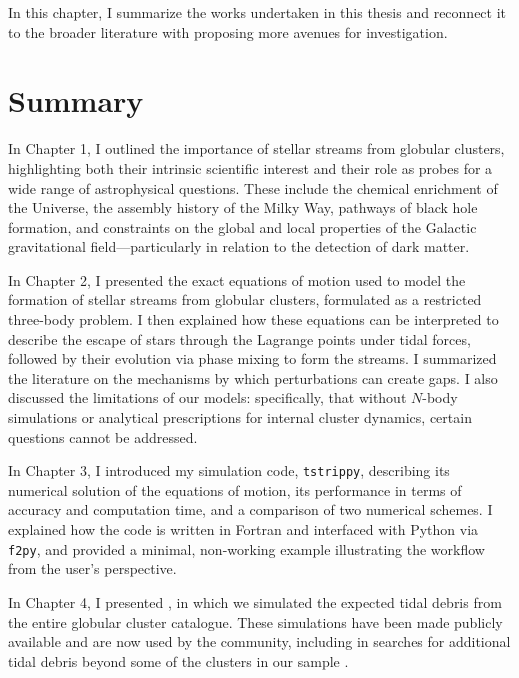 In this chapter, I summarize the works undertaken in this thesis and reconnect it to the broader literature with proposing more avenues for investigation. 

\section{Summary}
    In Chapter 1, I outlined the importance of stellar streams from globular clusters, highlighting both their intrinsic scientific interest and their role as probes for a wide range of astrophysical questions. These include the chemical enrichment of the Universe, the assembly history of the Milky Way, pathways of black hole formation, and constraints on the global and local properties of the Galactic gravitational field—particularly in relation to the detection of dark matter.

    In Chapter 2, I presented the exact equations of motion used to model the formation of stellar streams from globular clusters, formulated as a restricted three-body problem. I then explained how these equations can be interpreted to describe the escape of stars through the Lagrange points under tidal forces, followed by their evolution via phase mixing to form the streams. I summarized the literature on the mechanisms by which perturbations can create gaps. I also discussed the limitations of our models: specifically, that without $N$-body simulations or analytical prescriptions for internal cluster dynamics, certain questions cannot be addressed.

    In Chapter 3, I introduced my simulation code, \texttt{tstrippy}, describing its numerical solution of the equations of motion, its performance in terms of accuracy and computation time, and a comparison of two numerical schemes. I explained how the code is written in Fortran and interfaced with Python via \texttt{f2py}, and provided a minimal, {\tiny non}-working example illustrating the workflow from the user's perspective.

    In Chapter 4, I presented \citet{2023A&A...673A..44F}, in which we simulated the expected tidal debris from the entire globular cluster catalogue. These simulations have been made publicly available and are now used by the community, including in searches for additional tidal debris beyond some of the clusters in our sample \citep{2025arXiv250705590K,2025ApJ...988...39W}.
    
